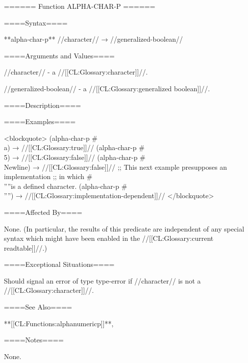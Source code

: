 ====== Function ALPHA-CHAR-P ======

====Syntax====

**alpha-char-p** //character// → //generalized-boolean//

====Arguments and Values====

//character// - a //[[CL:Glossary:character]]//.

//generalized-boolean// - a //[[CL:Glossary:generalized boolean]]//.

====Description====


====Examples====

\def\alfa{''\alpha''} <blockquote> (alpha-char-p #\\a) → //[[CL:Glossary:true]]// (alpha-char-p #\\5) → //[[CL:Glossary:false]]// (alpha-char-p #\\Newline) → //[[CL:Glossary:false]]// ;; This next example presupposes an implementation ;; in which #\\\alfa is a defined character. (alpha-char-p #\\\alfa) → //[[CL:Glossary:implementation-dependent]]// </blockquote>

====Affected By====

None. (In particular, the results of this predicate are independent of any special syntax which might have been enabled in the //[[CL:Glossary:current readtable]]//.)

====Exceptional Situations====

Should signal an error of type type-error if //character// is not a //[[CL:Glossary:character]]//.

====See Also====

**[[CL:Functions:alphanumericp]]**, {\secref\ImplementationDefinedScripts}

====Notes====

None.

